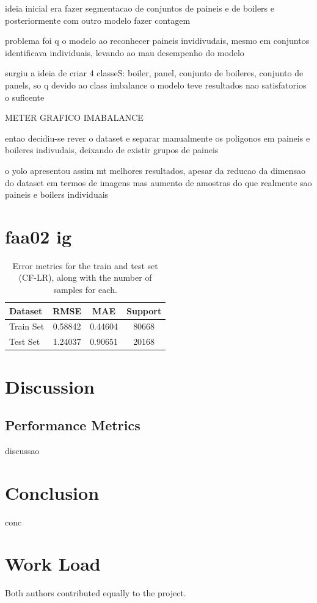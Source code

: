 \documentclass[conference]{IEEEtran}
\begin{document}
ideia inicial era fazer segmentacao de conjuntos de paineis e de boilers e posteriormente com outro modelo fazer contagem

problema foi q o modelo ao reconhecer paineis invidivudais, mesmo em conjuntos identificava individuais, levando ao mau desempenho do modelo

surgiu a ideia de criar 4 classeS: boiler, panel, conjunto de boileres, conjunto de panels, so q devido ao class imbalance o modelo teve resultados nao satisfatorios o suficente

METER GRAFICO IMABALANCE

entao decidiu-se rever o dataset e separar manualmente os poligonos em paineis e boileres indivudais, deixando de existir grupos de paineis

o yolo apresentou assim mt melhores resultados, apesar da reducao da dimensao do dataset em termos de imagens mas aumento de amostras do que realmente sao paineis e boilers individuais



\section{faa02 ig}



\begin{table}[H]
\centering
\caption{Error metrics for the train and test set (CF-LR), along with the number of samples for each.}
\label{tab:model01_results}
\begin{tabular}{lccc}
\toprule
\textbf{Dataset} & \textbf{RMSE} & \textbf{MAE} & \textbf{Support} \\
\midrule
Train Set & 0.58842 & 0.44604 & 80668 \\
Test Set & 1.24037 & 0.90651 & 20168 \\
\bottomrule
\end{tabular}
\end{table}

\section{Discussion} 

\subsection{Performance Metrics}

discussao


\section{Conclusion}

conc


\section*{Work Load}

Both authors contributed equally to the project.



\end{document}
